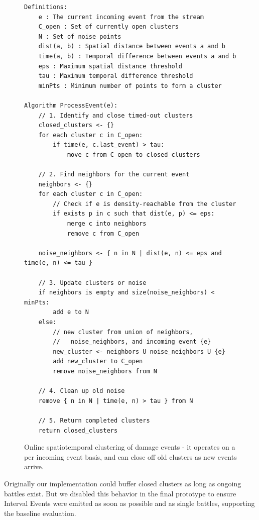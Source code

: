 \begin{figure}[H]
\begin{verbatim}
Definitions:
    e : The current incoming event from the stream
    C_open : Set of currently open clusters
    N : Set of noise points
    dist(a, b) : Spatial distance between events a and b
    time(a, b) : Temporal difference between events a and b
    eps : Maximum spatial distance threshold
    tau : Maximum temporal difference threshold
    minPts : Minimum number of points to form a cluster

Algorithm ProcessEvent(e):
    // 1. Identify and close timed-out clusters
    closed_clusters <- {}
    for each cluster c in C_open:
        if time(e, c.last_event) > tau:
            move c from C_open to closed_clusters

    // 2. Find neighbors for the current event
    neighbors <- {}
    for each cluster c in C_open:
        // Check if e is density-reachable from the cluster
        if exists p in c such that dist(e, p) <= eps:
            merge c into neighbors
            remove c from C_open

    noise_neighbors <- { n in N | dist(e, n) <= eps and time(e, n) <= tau }

    // 3. Update clusters or noise
    if neighbors is empty and size(noise_neighbors) < minPts:
        add e to N
    else:
        // new cluster from union of neighbors,
        //   noise_neighbors, and incoming event {e}
        new_cluster <- neighbors U noise_neighbors U {e}
        add new_cluster to C_open
        remove noise_neighbors from N

    // 4. Clean up old noise
    remove { n in N | time(e, n) > tau } from N

    // 5. Return completed clusters
    return closed_clusters
\end{verbatim}
  \caption{Online spatiotemporal clustering of damage events - it operates on a per incoming event basis, and can close off old clusters as new events arrive.}
  \label{lst:online-dbscan}
\end{figure}

Originally our implementation could buffer closed clusters as long as ongoing battles exist. But we disabled this behavior in the final prototype to ensure Interval Events were emitted as soon as possible and as single battles, supporting the baseline evaluation.

